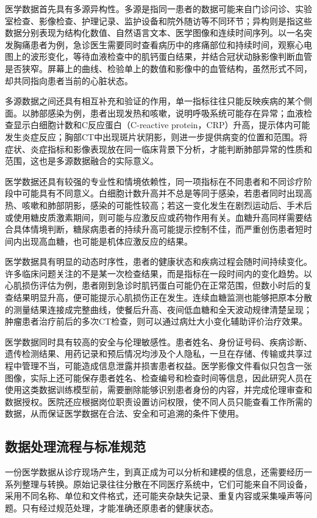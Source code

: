 医学数据首先具有多源异构性。多源是指同一患者的数据可能来自门诊问诊、实验室检查、影像检查、护理记录、监护设备和院外随访等不同环节；异构则是指这些数据分别表现为结构化数值、自然语言文本、医学图像和连续时间序列。以一名突发胸痛患者为例，急诊医生需要同时查看病历中的疼痛部位和持续时间，观察心电图上的波形变化，等待血液检查中的肌钙蛋白结果，并结合冠状动脉影像判断血管是否狭窄。屏幕上的曲线、检验单上的数值和影像中的血管结构，虽然形式不同，却共同指向患者当前的心脏状态。

多源数据之间还具有相互补充和验证的作用，单一指标往往只能反映疾病的某个侧面。以肺部感染为例，患者出现发热和咳嗽，说明呼吸系统可能存在异常；血液检查显示白细胞计数和C反应蛋白（C-reactive protein，CRP）升高，提示体内可能发生炎症反应；胸部CT中出现斑片状阴影，则进一步提供病变的位置和范围。将症状、炎症指标和影像表现放在同一临床背景下分析，才能判断肺部异常的性质和范围，这也是多源数据融合的实际意义。

医学数据还具有较强的专业性和情境依赖性，同一项指标在不同患者和不同诊疗阶段中可能具有不同意义。白细胞计数升高并不总是等同于感染，若患者同时出现高热、咳嗽和肺部阴影，感染的可能性较高；若这一变化发生在剧烈运动后、手术后或使用糖皮质激素期间，则可能与应激反应或药物作用有关。血糖升高同样需要结合具体情境判断，糖尿病患者的持续升高可能提示控制不佳，而严重创伤患者短时间内出现高血糖，也可能是机体应激反应的结果。

医学数据具有明显的动态时序性，患者的健康状态和疾病过程会随时间持续变化。许多临床问题关注的不是某一次检查结果，而是指标在一段时间内的变化趋势。以心肌损伤评估为例，患者刚到急诊时肌钙蛋白可能仍在正常范围，但数小时后的复查结果明显升高，便可能提示心肌损伤正在发生。连续血糖监测也能够把原本分散的测量结果连接成完整曲线，使餐后升高、夜间低血糖和全天波动规律清楚呈现；肿瘤患者治疗前后的多次CT检查，则可以通过病灶大小变化辅助评价治疗效果。

医学数据同时具有较高的安全与伦理敏感性。患者姓名、身份证号码、疾病诊断、遗传检测结果、用药记录和预后情况均涉及个人隐私，一旦在存储、传输或共享过程中管理不当，可能造成信息泄露并损害患者权益。医学影像文件看似只包含一张图像，实际上还可能保存患者姓名、检查编号和检查时间等信息，因此研究人员在使用这类数据训练模型前，需要删除能够识别患者身份的内容，并完成伦理审查和数据授权。医院还应根据岗位职责设置访问权限，使不同人员只能查看工作所需的数据，从而保证医学数据在合法、安全和可追溯的条件下使用。

\subsection{数据处理流程与标准规范}
一份医学数据从诊疗现场产生，到真正成为可以分析和建模的信息，还需要经历一系列整理与转换。原始记录往往分散在不同医疗系统中，它们可能来自不同设备，采用不同名称、单位和文件格式，还可能夹杂缺失记录、重复内容或采集噪声等问题。只有经过规范处理，才能准确还原患者的健康状态。


